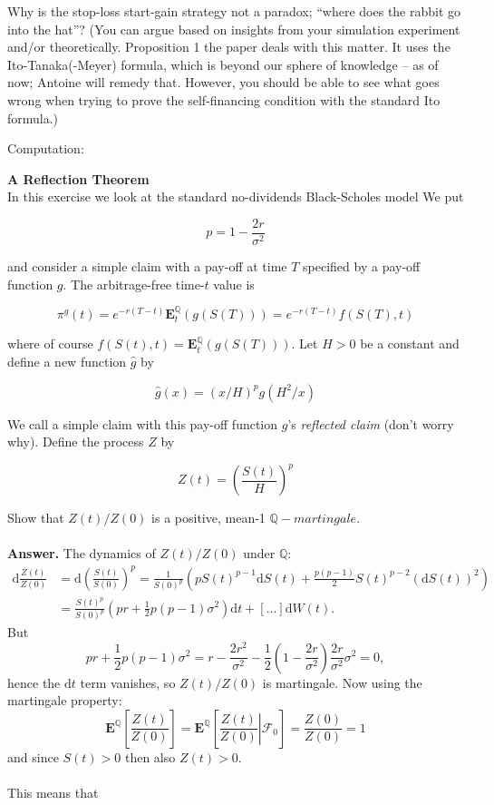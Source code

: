 \documentclass[a4paper]{article}
\begin{document}
Why is the stop-loss start-gain strategy not a paradox; ``where does the rabbit go into the hat''? (You can argue based on insights from your simulation experiment and/or theoretically. Proposition 1 the paper deals with this matter. It uses the Ito-Tanaka(-Meyer) formula, which is beyond our sphere of knowledge -- as of now; Antoine will remedy that. However, you should be able to see what goes wrong when trying to prove the self-financing condition with the standard Ito formula.)

\vspace{0.2cm}
Computation:

\vspace{0.4cm}
{\Large{\textbf{A Reflection Theorem}}}\\
\vspace{0.2cm}
In this exercise we look at the standard no-dividends Black-Scholes model We put

$$p = 1-\frac{2r}{\sigma^2}$$

and consider a simple claim with a pay-off at time $T$ specified by a pay-off function $g$. The arbitrage-free time-$t$ value is

$$\pi^{g}\left(t\right)=e^{-r\left(T-t\right)}\mathbf{E}^{\mathbb{Q}}_{t}\left(g\left(S\left(T\right)\right)\right)=e^{-r\left(T-t\right)}f\left(S\left(T\right),t\right)$$

where of course $f\left(S\left(t\right),t\right)=\mathbf{E}^{\mathbb{Q}}_{t}\left(g\left(S\left(T\right)\right)\right)$. Let $H > 0$ be a constant and define a new function $\hat{g}$ by

$$\hat{g}\left(x\right)=\left(x/H\right)^{p}g\left(H^{2}/x\right)$$

We call a simple claim with this pay-off function $g$'s \textit{reflected claim} (don't worry why).
Define the process $Z$ by

$$Z\left(t\right) = \left(\frac{S\left(t\right)}{H}\right)^{p}$$

Show that $Z\left(t\right)/Z\left(0\right)$ is a positive, mean-1 $\mathbb{Q}-martingale$.\\
\\
\textbf{Answer.} The dynamics of $Z(t)/Z(0)$ under $\mathbb{Q}$:
\begin{align*}
\text{d}\frac{Z(t)}{Z(0)} &= \text{d}\left(\frac{S(t)}{S(0)}\right)^p=\frac{1}{S(0)^p}\left(pS(t)^{p-1}\text{d}S(t)+\frac{p(p-1)}{2}S(t)^{p-2}(\text{d}S(t))^2\right)\\
&=\frac{S(t)^p}{S(0)^p}\left(pr+\frac{1}{2}p(p-1)\sigma^2\right)\text{d}t+[\ldots]\text{d}W(t).
\end{align*}
But
$$
pr+\frac{1}{2}p(p-1)\sigma^2=r-\frac{2r^2}{\sigma^2}-\frac{1}{2}\left(1-\frac{2r}{\sigma^2}\right)\frac{2r}{\sigma^2}\sigma^2=0,
$$
hence the $\text{d}t$ term vanishes, so $Z(t)/Z(0)$ is martingale. Now using the martingale property:
$$
\mathbf{E}^{\mathbb{Q}}\left[\frac{Z(t)}{Z(0)}\right]=\left.\mathbf{E}^{\mathbb{Q}}\left[\frac{Z(t)}{Z(0)}\right|\mathcal{F}_0\right]=\frac{Z(0)}{Z(0)}=1
$$
and since $S(t)>0$ then also $Z(t)>0$.\\
\\
This means that
\end{document}
